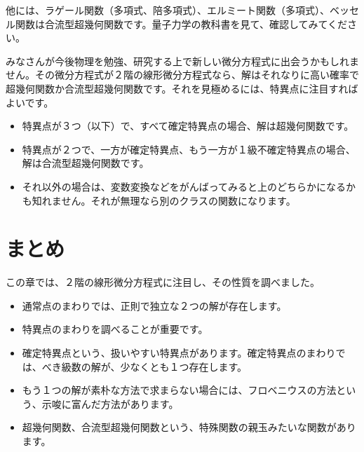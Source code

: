 \documentclass[report,paper=a4, fontsize=12pt, line_length=16cm, number_of_lines=33,dvipdfmx]{jlreq}
\numberwithin{equation}{section}
\begin{document}
他には、ラゲール関数（多項式、陪多項式）、エルミート関数（多項式）、ベッセル関数は合流型超幾何関数です。量子力学の教科書を見て、確認してみてください。

みなさんが今後物理を勉強、研究する上で新しい微分方程式に出会うかもしれません。その微分方程式が２階の線形微分方程式なら、解はそれなりに高い確率で超幾何関数か合流型超幾何関数です。それを見極めるには、特異点に注目すればよいです。
\begin{itemize}
  \item 特異点が３つ（以下）で、すべて確定特異点の場合、解は超幾何関数です。
  \item 特異点が２つで、一方が確定特異点、もう一方が１級不確定特異点の場合、解は合流型超幾何関数です。
  \item それ以外の場合は、変数変換などをがんばってみると上のどちらかになるかも知れません。それが無理なら別のクラスの関数になります。
\end{itemize}

\section{まとめ}
この章では、２階の線形微分方程式に注目し、その性質を調べました。
\begin{itemize}
  \item 通常点のまわりでは、正則で独立な２つの解が存在します。
  \item 特異点のまわりを調べることが重要です。
  \item 確定特異点という、扱いやすい特異点があります。確定特異点のまわりでは、べき級数の解が、少なくとも１つ存在します。
  \item もう１つの解が素朴な方法で求まらない場合には、フロベニウスの方法という、示唆に富んだ方法があります。
  \item 超幾何関数、合流型超幾何関数という、特殊関数の親玉みたいな関数があります。
\end{itemize}
\end{document}
